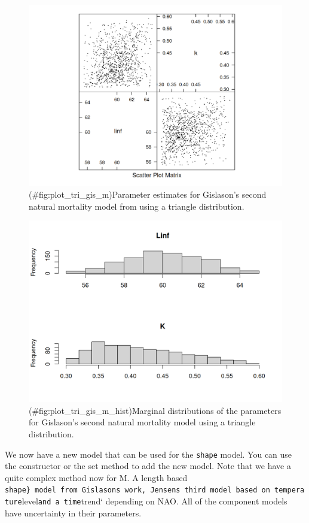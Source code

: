 \documentclass[
]{book}
\begin{document}
\begin{figure}
\centering
\includegraphics{_bookdown_files/_main_files/figure-html/plot_tri_gis_m-1.png}
\caption{(\#fig:plot\_tri\_gis\_m)Parameter estimates for Gislason's second natural mortality model from using a triangle distribution.}
\end{figure}

\begin{figure}
\centering
\includegraphics{_bookdown_files/_main_files/figure-html/plot_tri_gis_m_hist-1.png}
\caption{(\#fig:plot\_tri\_gis\_m\_hist)Marginal distributions of the parameters for Gislason's second natural mortality model using a triangle distribution.}
\end{figure}

We now have a new model that can be used for the \texttt{shape} model. You can use the constructor or the set method to add the new model. Note that we have a quite complex method now for M. A length based \texttt{shape\}\ model\ from\ Gislason\textquotesingle{}s\ work,\ Jensen\textquotesingle{}s\ third\ model\ based\ on\ temperature}level\texttt{and\ a\ time}trend` depending on NAO. All of the component models have uncertainty in their parameters.
\end{document}
